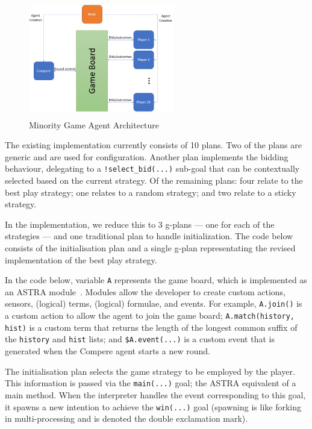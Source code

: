 \begin{figure}[!tbh]
\centering
\includegraphics[height=2in, width=2.5in]{figs/mg.png}
\caption{Minority Game Agent Architecture}
\label{fig:mgagents}
\end{figure}

The existing implementation currently consists of 10 plans. Two of the plans are generic and are
used for configuration. Another plan implements the bidding behaviour, delegating to a 
\verb|!select_bid(...)| sub-goal that can be contextually selected based on the current strategy.
Of the remaining plans: four relate to the best play strategy; one relates to a random strategy;
and two relate to a sticky strategy.


In the {\aser} implementation, we reduce this to 3 g-plans --- one for each of the strategies --- 
and one traditional plan to handle initialization. The code below consists of the initialisation 
plan and a single g-plan representating the revised implementation of the best play strategy.

In the code below, variable \verb|A| represents the game board, which
is implemented as an ASTRA module~\cite{DBLP:conf/prima/CollierRL15}. Modules allow the developer to
create custom actions, sensors, (logical) terms, (logical) formulae,
and events. For example, \verb|A.join()| is a custom action to allow
the agent to join the game board; \verb|A.match(history, hist)| is a
custom term that returns the length of the longest common suffix of the
\verb|history| and \verb|hist| lists; and
\verb|$A.event(...)| is a custom event that is generated when the
Compere agent starts a new round.

The initialisation plan selects the game strategy to be employed by the player. This information
 is passed via the \verb|main(...)| goal; the ASTRA equivalent of a
 main method. When the interpreter handles
the event corresponding to this goal, it spawns a new intention to achieve the \verb|win(...)| 
goal (spawning is like forking in multi-processing and is denoted the double exclamation mark).

